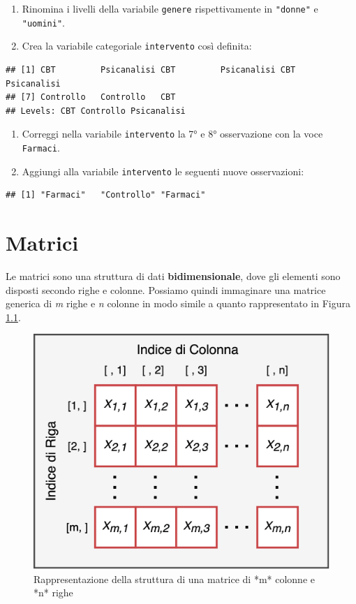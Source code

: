 \documentclass[
]{book}
\providecommand{\tightlist}{%
  \setlength{\itemsep}{0pt}\setlength{\parskip}{0pt}}
\begin{document}
\begin{enumerate}
\def\labelenumi{\arabic{enumi}.}
\setcounter{enumi}{1}
\tightlist
\item
  Rinomina i livelli della variabile \texttt{genere} rispettivamente in \texttt{"donne"} e \texttt{"uomini"}.
\item
  Crea la variabile categoriale \texttt{intervento} così definita:
\end{enumerate}

\begin{verbatim}
## [1] CBT         Psicanalisi CBT         Psicanalisi CBT         Psicanalisi
## [7] Controllo   Controllo   CBT        
## Levels: CBT Controllo Psicanalisi
\end{verbatim}

\begin{enumerate}
\def\labelenumi{\arabic{enumi}.}
\setcounter{enumi}{3}
\tightlist
\item
  Correggi nella variabile \texttt{intervento} la 7° e 8° osservazione con la voce \texttt{Farmaci}.
\item
  Aggiungi alla variabile \texttt{intervento} le seguenti nuove osservazioni:
\end{enumerate}

\begin{verbatim}
## [1] "Farmaci"   "Controllo" "Farmaci"
\end{verbatim}

\hypertarget{matrix}{%
\chapter{Matrici}\label{matrix}}

Le matrici sono una struttura di dati \textbf{bidimensionale}, dove gli elementi sono disposti secondo righe e colonne. Possiamo quindi immaginare una matrice generica di \emph{m} righe e \emph{n} colonne in modo simile a quanto rappresentato in Figura \ref{fig:matrix}.

\begin{figure}

{\centering \includegraphics[width=0.75\linewidth]{images/matrix} 

}

\caption{Rappresentazione della struttura di una matrice di *m* colonne e *n* righe}\label{fig:matrix}
\end{figure}
\end{document}

